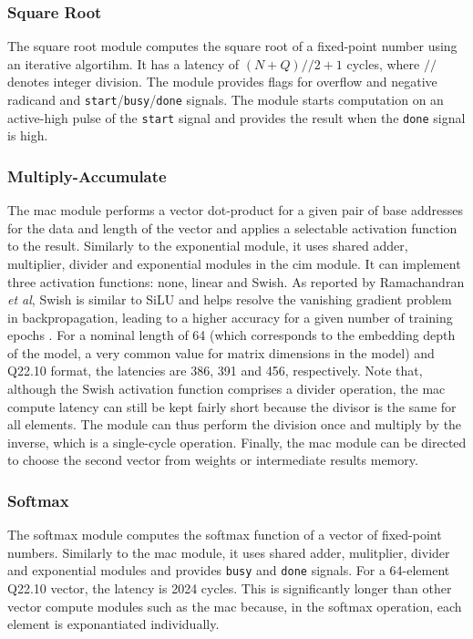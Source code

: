 \subsubsection{Square Root}
The square root module computes the square root of a fixed-point number using an iterative algortihm. It has a latency of $(N+Q)//2+1$ cycles, where $//$ denotes integer division. The module 
provides flags for overflow and negative radicand and \texttt{start}/\texttt{busy}/\texttt{done} signals. The module starts computation on an active-high pulse of the \texttt{start} signal and provides the result when 
the \texttt{done} signal is high.

\subsubsection{Multiply-Accumulate}
The \ac{mac} module performs a vector dot-product for a given pair of base addresses for the data and length of the vector and applies a selectable activation function to the result. Similarly
to the exponential module, it uses shared adder, multiplier, divider and exponential modules in the \ac{cim} module. It can implement three activation functions: none, linear and Swish. As
reported by Ramachandran \textit{et al}, Swish is similar to SiLU and helps resolve the vanishing gradient problem in backpropagation, leading to a higher accuracy for a given number of training
epochs \cite{ramachandran2017searching}. For a nominal length of 64 (which corresponds to the embedding depth of the model, a very common value for matrix dimensions in the model) and Q22.10 format,
the latencies are 386, 391 and 456, respectively. Note that, although the Swish activation function comprises a divider operation, the \ac{mac} compute latency can still be kept fairly short because
the divisor is the same for all elements. The module can thus perform the division once and multiply by the inverse, which is a single-cycle operation. Finally, the \ac{mac} module can be directed
to choose the second vector from weights or intermediate results memory.

\subsubsection{Softmax}
The softmax module computes the softmax function of a vector of fixed-point numbers. Similarly to the \ac{mac} module, it uses shared adder, mulitplier, divider and exponential modules and 
provides \texttt{busy} and \texttt{done} signals. For a 64-element Q22.10 vector, the latency is 2024 cycles. This is significantly longer than other vector compute modules such as the \ac{mac}
because, in the softmax operation, each element is exponantiated individually.

